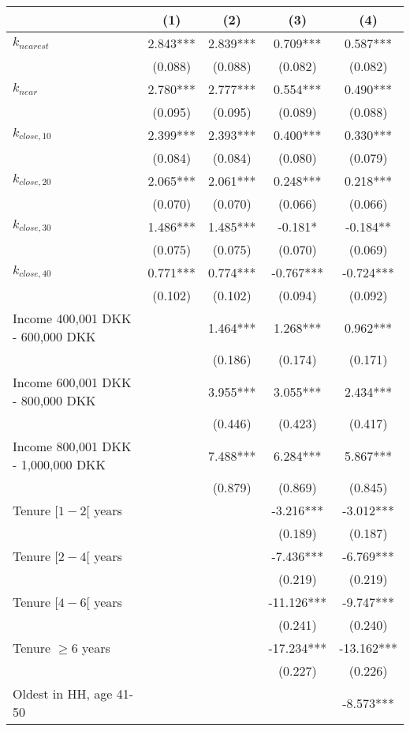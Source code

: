\begin{tabular}{lcccc}
\toprule
  & (1) & (2) & (3) & (4) \\ 
\midrule
$k_{nearest}$ & 2.843*** & 2.839*** & 0.709*** & 0.587*** \\ 
 & (0.088) & (0.088) & (0.082) & (0.082) \\ 
$k_{near}$ & 2.780*** & 2.777*** & 0.554*** & 0.490*** \\ 
 & (0.095) & (0.095) & (0.089) & (0.088) \\ 
$k_{close, 10}$ & 2.399*** & 2.393*** & 0.400*** & 0.330*** \\ 
 & (0.084) & (0.084) & (0.080) & (0.079) \\ 
$k_{close, 20}$ & 2.065*** & 2.061*** & 0.248*** & 0.218*** \\ 
 & (0.070) & (0.070) & (0.066) & (0.066) \\ 
$k_{close, 30}$ & 1.486*** & 1.485*** & -0.181* & -0.184** \\ 
 & (0.075) & (0.075) & (0.070) & (0.069) \\ 
$k_{close, 40}$ & 0.771*** & 0.774*** & -0.767*** & -0.724*** \\ 
 & (0.102) & (0.102) & (0.094) & (0.092) \\ 
Income 400,001 DKK - 600,000 DKK &  & 1.464*** & 1.268*** & 0.962*** \\ 
 &  & (0.186) & (0.174) & (0.171) \\ 
Income 600,001 DKK - 800,000 DKK &  & 3.955*** & 3.055*** & 2.434*** \\ 
 &  & (0.446) & (0.423) & (0.417) \\ 
Income 800,001 DKK - 1,000,000 DKK &  & 7.488*** & 6.284*** & 5.867*** \\ 
 &  & (0.879) & (0.869) & (0.845) \\ 
Tenure $[1-2[$ years &  &  & -3.216*** & -3.012*** \\ 
 &  &  & (0.189) & (0.187) \\ 
Tenure $[2-4[$ years &  &  & -7.436*** & -6.769*** \\ 
 &  &  & (0.219) & (0.219) \\ 
Tenure $[4-6[$ years &  &  & -11.126*** & -9.747*** \\ 
 &  &  & (0.241) & (0.240) \\ 
Tenure $\geq 6$ years &  &  & -17.234*** & -13.162*** \\ 
 &  &  & (0.227) & (0.226) \\ 
Oldest in HH, age 41-50 &  &  &  & -8.573*** \\ 

\end{tabular}
